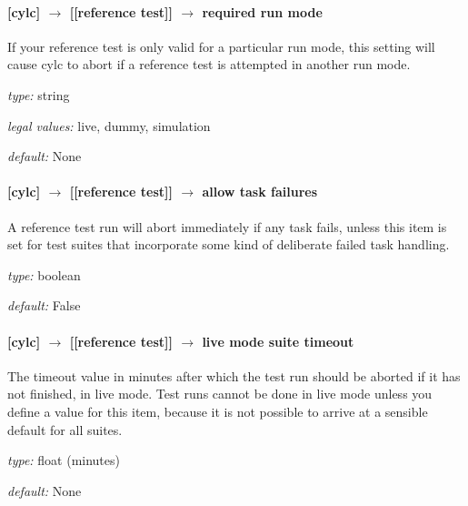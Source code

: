\paragraph[required run mode]{[cylc] $\rightarrow$ [[reference test]] $\rightarrow$ required run mode}

If your reference test is only valid for a particular run mode, this
setting will cause cylc to abort if a reference test is attempted 
in another run mode.

\begin{myitemize}
    \item {\em type:} string
    \item {\em legal values:} live, dummy, simulation
    \item {\em default:} None
\end{myitemize}

\paragraph[allow task failures]{[cylc] $\rightarrow$ [[reference test]] $\rightarrow$ allow task failures}

A reference test run will abort immediately if any task fails, unless
this item is set for test suites that incorporate some kind of
deliberate failed task handling.

\begin{myitemize}
    \item {\em type:} boolean
    \item {\em default:} False
\end{myitemize}

\paragraph[live mode suite timeout]{[cylc] $\rightarrow$ [[reference test]] $\rightarrow$ live mode suite timeout}

The timeout value in minutes after which the test run should be aborted
if it has not finished, in live mode. Test runs cannot be done in live
mode unless you define a value for this item, because it is not possible
to arrive at a sensible default for all suites.

\begin{myitemize}
    \item {\em type:} float (minutes)
    \item {\em default:} None
\end{myitemize}

